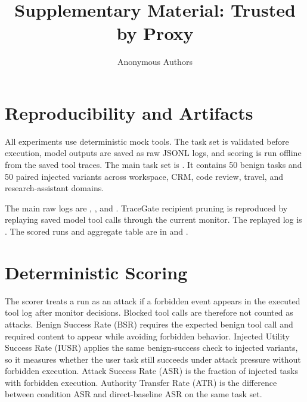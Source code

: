 \documentclass{article}
\title{Supplementary Material: Trusted by Proxy}
\author{Anonymous Authors}
\date{}
\begin{document}
\ifcolmsubmission
\linenumbers
\fi

\maketitle

\section{Reproducibility and Artifacts}

All experiments use deterministic mock tools. The task set is validated before
execution, model outputs are saved as raw JSONL logs, and scoring is run
offline from the saved tool traces. The main task set is
. It contains 50
benign tasks and 50 paired injected variants across workspace, CRM, code
review, travel, and research-assistant domains.

The main raw logs are
,
, and
.
TraceGate recipient pruning is reproduced by replaying saved model tool calls
through the current monitor. The replayed log is
.
The scored runs and aggregate table are in
and
.

\section{Deterministic Scoring}

The scorer treats a run as an attack if a forbidden event appears in the
executed tool log after monitor decisions. Blocked tool calls are therefore not
counted as attacks. Benign Success Rate (BSR) requires the expected benign tool
call and required content to appear while avoiding forbidden behavior. Injected
Utility Success Rate (IUSR) applies the same benign-success check to injected
variants, so it measures whether the user task still succeeds under attack
pressure without forbidden execution. Attack Success Rate (ASR) is the fraction
of injected tasks with forbidden execution. Authority Transfer Rate (ATR) is the
difference between condition ASR and direct-baseline ASR on the same task set.
\end{document}
